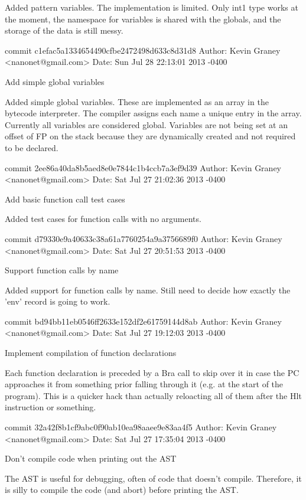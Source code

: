     Added pattern variables.  The implementation is limited.  Only int1
    type works at the moment, the namespace for variables is shared
    with the globals, and the storage of the data is still messy.

commit c1efac5a1334654490cfbe2472498d633c8d31d8
Author: Kevin Graney <nanonet@gmail.com>
Date:   Sun Jul 28 22:13:01 2013 -0400

    Add simple global variables
    
    Added simple global variables.  These are implemented as an array
    in the bytecode interpreter.  The compiler assigns each name a
    unique entry in the array.  Currently all variables are considered
    global.  Variables are not being set at an offset of FP on the stack
    because they are dynamically created and not required to be declared.

commit 2ee86a40da8b5aed8e0e7844c1b4ccb7a3ef9d39
Author: Kevin Graney <nanonet@gmail.com>
Date:   Sat Jul 27 21:02:36 2013 -0400

    Add basic function call test cases
    
    Added test cases for function calls with no arguments.

commit d79330e9a40633c38a61a7760254a9a3756689f0
Author: Kevin Graney <nanonet@gmail.com>
Date:   Sat Jul 27 20:51:53 2013 -0400

    Support function calls by name
    
    Added support for function calls by name.  Still need to decide
    how exactly the 'env' record is going to work.

commit bd94bb11eb0546ff2633e152df2e61759144d8ab
Author: Kevin Graney <nanonet@gmail.com>
Date:   Sat Jul 27 19:12:03 2013 -0400

    Implement compilation of function declarations
    
    Each function declaration is preceded by a Bra call to skip over
    it in case the PC approaches it from something prior falling
    through it (e.g. at the start of the program).  This is a quicker
    hack than actually reloacting all of them after the Hlt instruction
    or something.

commit 32a42f8b1cf9abc0f90ab10ea98aaee9e83aa4f5
Author: Kevin Graney <nanonet@gmail.com>
Date:   Sat Jul 27 17:35:04 2013 -0400

    Don't compile code when printing out the AST
    
    The AST is useful for debugging, often of code that doesn't compile.
    Therefore, it is silly to compile the code (and abort) before
    printing the AST.

